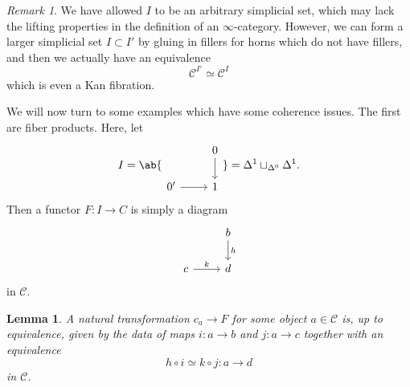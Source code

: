 \documentclass[10pt, oneside]{memoir}
\newtheorem{lem}[thm]{Lemma}
\theoremstyle{definition}
\theoremstyle{remark}
\newtheorem{rmk}[thm]{Remark}
\theoremstyle{plain}
\theoremstyle{definition}
\theoremstyle{remark}
\newcommand{\mc}[1]{\mathcal{#1}}
\newcommand{\1}{\mathbf{1}}
\newcommand{\2}{\mathbf{2}}
\newcommand{\3}{\mathbf{3}}
\begin{document}
\begin{rmk}
    We have allowed $I$ to be an arbitrary simplicial set, which may lack the lifting properties in the definition of an $\infty$-category. However, we can form a larger simplicial set $I \subset I'$ by gluing in fillers for horns which do not have fillers, and then we actually have an equivalence
    \[ \mc{C}^{I'} \simeq \mc{C}^I \]
    which is even a Kan fibration.
\end{rmk}

We will now turn to some examples which have some coherence issues. The first are fiber products. Here, let
\begin{equation*}I = \ab\{
\begin{tikzcd}[ampersand replacement=\&]
    \& 0 \ar{d} \\
    0' \ar{r} \& 1
\end{tikzcd} \} = \Delta^1 \sqcup_{\Delta^0} \Delta^1.
\end{equation*}
Then a functor $F \colon I \to C$ is simply a diagram
\begin{equation*}
\begin{tikzcd}
    & b \ar{d}{h} \\
    c \ar{r}{k} & d
\end{tikzcd}
\end{equation*}
in $\mc{C}$.

\begin{lem}
    A natural transformation $c_a \to F$ for some object $a \in \mc{C}$ is, up to equivalence, given by the data of maps $i \colon a \to b$ and $j \colon a \to c$ together with an equivalence
    \[ h \circ i \simeq k \circ j \colon a \to d \]
    in $\mc{C}$. 
\end{lem}
\end{document}
